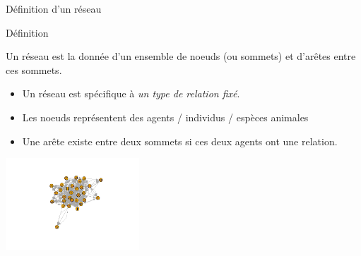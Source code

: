 \documentclass[compress,10pt]{beamer}
\begin{document}
\begin{frame}{Définition d'un réseau}

\begin{block}{Définition}

Un réseau est la donnée d'un ensemble de noeuds (ou sommets) et d'arêtes entre ces sommets.

\begin{itemize}
\item  Un réseau est spécifique à \emph{un type de relation fixé}. 
\item  Les noeuds représentent des agents / individus / espèces animales
\item  Une arête existe entre deux sommets si ces deux agents ont une relation. 
\end{itemize}
\end{block}
\centering
 \includegraphics[width = 5cm]{plots/Vanuatu_directed.png} 
\end{frame}
\end{document}
